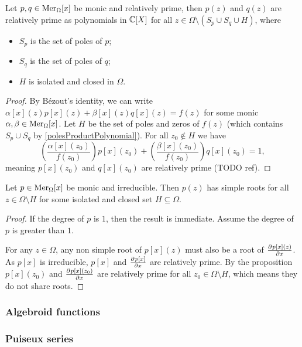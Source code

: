 \begin{proposition}
Let $p,q\in \operatorname{Mer}_\Omega[x]$ be monic and relatively prime, then $p(z)$ and $q(z)$ are relatively prime as polynomials in $\mathbb{C}[X]$ for all $z\in \Omega \setminus (S_p \cup S_q \cup H)$, where
\begin{itemize}
    \item $S_p$ is the set of poles of $p$;
    \item $S_q$ is the set of poles of $q$;
    \item $H$ is isolated and closed in $\Omega$.
\end{itemize}
\end{proposition}
\begin{proof}
By Bézout's identity, we can write $\alpha[x](z)p[x](z) + \beta[x](z)q[x](z) = f(z)$ for some monic $\alpha,\beta\in \operatorname{Mer}_\Omega[x]$. Let $H$ be the set of poles and zeros of $f(z)$ (which contains $S_p \cup S_q$ by \ref{polesProductPolynomial}). For all $z_0\notin H$ we have
\[ \left(\frac{\alpha[x](z_0)}{f(z_0)}\right)p[x](z_0) + \left(\frac{\beta[x](z_0)}{f(z_0)}\right)q[x](z_0) = 1, \]
meaning $p[x](z_0)$ and $q[x](z_0)$ are relatively prime (TODO ref).
\end{proof}
\begin{corollary}
Let $p\in \operatorname{Mer}_\Omega[x]$ be monic and irreducible. Then $p(z)$ has simple roots for all $z\in\Omega\setminus H$ for some isolated and closed set $H\subseteq \Omega$.
\end{corollary}
\begin{proof}
If the degree of $p$ is $1$, then the result is immediate. Assume the degree of $p$ is greater than $1$.

For any $z\in \Omega$, any non simple root of $p[x](z)$ must also be a root of $ \frac{\partial{^{}}p[x](z)}{\partial{{x}^{}}} $. As $p[x]$ is irreducible, $p[x]$ and $ \frac{\partial{^{}}p[x]}{\partial{{x}^{}}} $ are relatively prime. By the proposition $p[x](z_0)$ and $ \frac{\partial{^{}}p[x](z_0)}{\partial{{x}^{}}} $ are relatively prime for all $z_0\in \Omega\setminus H$, which means they do not share roots.
\end{proof}

\subsubsection{Algebroid functions}

\subsubsection{Puiseux series}


